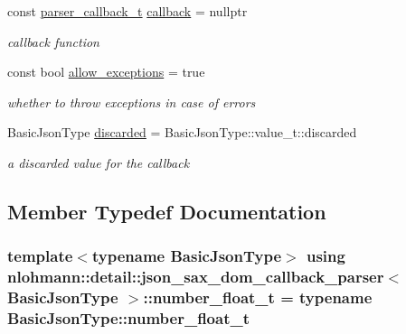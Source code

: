 \begin{DoxyCompactItemize}
const \hyperlink{classnlohmann_1_1detail_1_1json__sax__dom__callback__parser_a4f636086fa8e7cf26c35c8afd50903ce}{parser\+\_\+callback\+\_\+t} \hyperlink{classnlohmann_1_1detail_1_1json__sax__dom__callback__parser_a46a72dffd5be4a25602af00f0033c126}{callback} = nullptr
\begin{DoxyCompactList}\small\item\em callback function \end{DoxyCompactList}\item 
const bool \hyperlink{classnlohmann_1_1detail_1_1json__sax__dom__callback__parser_a0a1390c23e2a3da774d75c050f9b3f13}{allow\+\_\+exceptions} = true
\begin{DoxyCompactList}\small\item\em whether to throw exceptions in case of errors \end{DoxyCompactList}\item 
Basic\+Json\+Type \hyperlink{classnlohmann_1_1detail_1_1json__sax__dom__callback__parser_a8997ee6dc3bd39116b951465b946445e}{discarded} = Basic\+Json\+Type\+::value\+\_\+t\+::discarded
\begin{DoxyCompactList}\small\item\em a discarded value for the callback \end{DoxyCompactList}\end{DoxyCompactItemize}


\subsection{Member Typedef Documentation}
\subsubsection[{\texorpdfstring{number\+\_\+float\+\_\+t}{number_float_t}}]{\setlength{\rightskip}{0pt plus 5cm}template$<$typename Basic\+Json\+Type$>$ using {\bf nlohmann\+::detail\+::json\+\_\+sax\+\_\+dom\+\_\+callback\+\_\+parser}$<$ Basic\+Json\+Type $>$\+::{\bf number\+\_\+float\+\_\+t} =  typename Basic\+Json\+Type\+::number\+\_\+float\+\_\+t}\hypertarget{classnlohmann_1_1detail_1_1json__sax__dom__callback__parser_a914ea0555cea5290449fb791ae41c655}{}\label{classnlohmann_1_1detail_1_1json__sax__dom__callback__parser_a914ea0555cea5290449fb791ae41c655}
